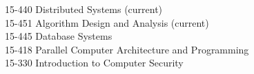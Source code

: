 
\begin{projects}

	\course
	{15-440 \tab} {Distributed Systems (current)} \\
	\course
	{15-451 \tab} {Algorithm Design and Analysis (current)} \\
	\course
	{15-445 \tab} {Database Systems} \\
	\course
	{15-418 \tab} {Parallel Computer Architecture and Programming} \\
    \course
	{15-330 \tab} {Introduction to Computer Security} \\

\end{projects}
